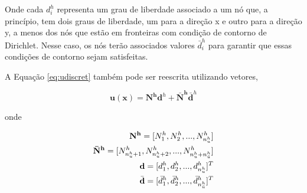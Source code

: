 Onde cada $d_i^h$ representa um grau de liberdade associado a um nó que, a princípio,  tem dois graus de liberdade, um para a direção x e outro para a direção y, a menos dos nós que estão em fronteiras com condição de contorno de Dirichlet. Nesse caso, os nós terão associados valores $\bar{d}_i^h$ para garantir que essas condições de contorno sejam satisfeitas.




A Equação \eqref{eq:udiscret} também pode ser reescrita utilizando vetores,

\begin{equation}\label{eq:udiscretvetor}
\mathbf{u}(\mathbf{x}) = \mathbf{N^h} \mathbf{d}^h + \mathbf{\bar{N}^h} \mathbf{\bar{d}}^h
\end{equation}

onde

\begin{eqnarray*}
\mathbf{N^h} = [N^h_1, N^h_2, ..., N^h_{n_u^h} ] \\
\mathbf{\bar{N}^h}  =[N^h_{n_u^h + 1}, N^h_{n_u^h + 2}, ..., N^h_{n_u^h + n_{\bar{u}}^h}] \\
\mathbf{d} = [d_1^h, d_2^h, ... , d_{n_u^h}^h]^T \\
\bar{\mathbf{d}} = [\bar{d}_1^h, \bar{d}_2^h, ... , \bar{d}_{n_{\bar{u}}^h}^h]^T
\end{eqnarray*}



